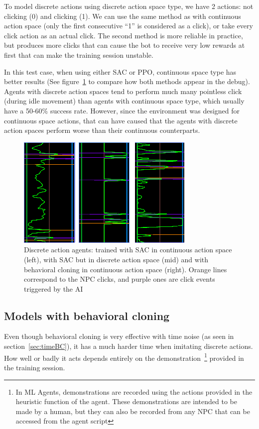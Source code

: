 To model discrete actions using discrete action space type, we have 2 actions: not clicking (0) and clicking (1). We can use the same method as with continuous action space (only the first consecutive ``1'' is considered as a click), or take every click action as an actual click. The second method is more reliable in practice, but produces more clicks that can cause the bot to receive very low rewards at first that can make the training session unstable.

In this test case, when using either SAC or PPO, continuous space type has better results (See figure~\ref{fig:discCases} to compare how both methods appear in the debug). Agents with discrete action spaces tend to perform much many pointless click (during idle movement) than agents with continuous space type, which usually have a 50-60\% success rate. However, since the environment was designed for continuous space actions, that can have caused that the agents with discrete action spaces perform worse than their continuous counterparts.

\begin{figure}[h]
  \centering
		\includegraphics[width=.85\textwidth]{img/gphDiscActions.png}
  \caption{Discrete action agents: trained with SAC in continuous action space (left), with SAC but in discrete action space (mid) and with behavioral cloning in continuous action space (right). Orange lines correspond to the NPC clicks, and purple ones are click events triggered by the AI}
  \label{fig:discCases}
\end{figure}

\subsection{Models with behavioral cloning}%

Even though behavioral cloning is very effective with time noise (as seen in section~\ref{sec:timeBC}), it has a much harder time when imitating discrete actions. How well or badly it acts depends entirely on the demonstration~\footnote{In ML Agents, demonstrations are recorded using the actions provided in the heuristic function of the agent. These demonstrations are intended to be made by a human, but they can also be recorded from any NPC that can be accessed from the agent script} provided in the training session.


